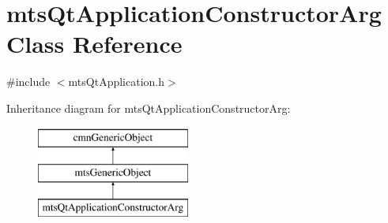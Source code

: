 \hypertarget{classmts_qt_application_constructor_arg}{}\section{mts\+Qt\+Application\+Constructor\+Arg Class Reference}
\label{classmts_qt_application_constructor_arg}


{\ttfamily \#include $<$mts\+Qt\+Application.\+h$>$}

Inheritance diagram for mts\+Qt\+Application\+Constructor\+Arg\+:\begin{figure}[H]
\begin{center}
\leavevmode
\includegraphics[height=3.000000cm]{d8/d27/classmts_qt_application_constructor_arg}
\end{center}
\end{figure}
